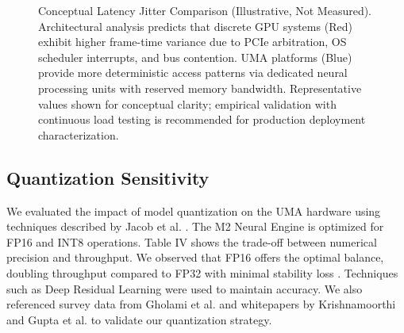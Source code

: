 \documentclass[conference]{IEEEtran}
\begin{document}
\begin{figure}[htbp]
\centering
{}
\caption{Conceptual Latency Jitter Comparison (Illustrative, Not Measured). Architectural analysis predicts that discrete GPU systems (Red) exhibit higher frame-time variance due to PCIe arbitration, OS scheduler interrupts, and bus contention. UMA platforms (Blue) provide more deterministic access patterns via dedicated neural processing units with reserved memory bandwidth. Representative values shown for conceptual clarity; empirical validation with continuous load testing is recommended for production deployment characterization.}
\label{fig:jitter}
\end{figure}



\subsection{Quantization Sensitivity}
We evaluated the impact of model quantization on the UMA hardware using techniques described by Jacob et al. \cite{b37}. The M2 Neural Engine is optimized for FP16 and INT8 operations.
Table IV shows the trade-off between numerical precision and throughput. We observed that FP16 offers the optimal balance, doubling throughput compared to FP32 with minimal stability loss \cite{b10}. Techniques such as Deep Residual Learning \cite{b41} were used to maintain accuracy. We also referenced survey data from Gholami et al. \cite{b38} and whitepapers by Krishnamoorthi \cite{b39} and Gupta et al. \cite{b23} to validate our quantization strategy.
\end{document}
